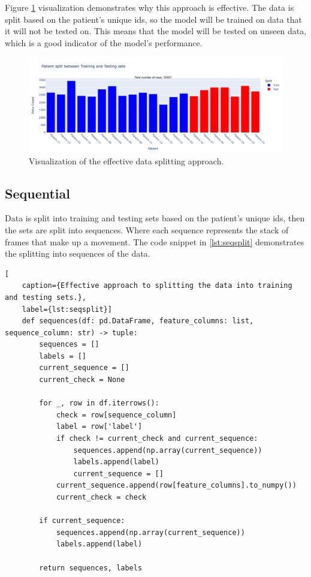             Figure \ref{fig:goodsplit} visualization demonstrates why this approach is effective. The data is split based on the patient's unique ids, so the model will be trained on data that it will not be tested on. This means that the model will be tested on unseen data, which is a good indicator of the model's performance.

            \begin{figure}[H]
                \centering
                \includegraphics[width=1.0\textwidth]{../src/resources/good_split.png}
                \caption{
                    Visualization of the effective data splitting approach.
                }
                \label{fig:goodsplit}
            \end{figure}

    \newpage
        \subsection{Sequential} \label{sec:seqsplit}
            Data is split into training and testing sets based on the patient's unique ids, then the sets are split into sequences. Where each sequence represents the stack of frames that make up a movement. The code snippet in \ref{lst:seqsplit} demonstrates the splitting into sequences of the data. 

\begin{lstlisting}[
    caption={Effective approach to splitting the data into training and testing sets.}, 
    label={lst:seqsplit}]                
    def sequences(df: pd.DataFrame, feature_columns: list, sequence_column: str) -> tuple:
        sequences = []
        labels = []
        current_sequence = []
        current_check = None

        for _, row in df.iterrows():
            check = row[sequence_column]
            label = row['label']
            if check != current_check and current_sequence:
                sequences.append(np.array(current_sequence))
                labels.append(label)
                current_sequence = []
            current_sequence.append(row[feature_columns].to_numpy())
            current_check = check

        if current_sequence: 
            sequences.append(np.array(current_sequence))
            labels.append(label)

        return sequences, labels
\end{lstlisting}

